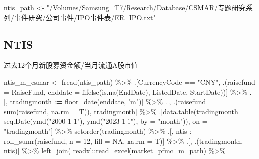 \documentclass[
]{article}
\newenvironment{Shaded}{\begin{snugshade}}{\end{snugshade}}
\newcommand{\AttributeTok}[1]{\textcolor[rgb]{0.77,0.63,0.00}{#1}}
\newcommand{\ConstantTok}[1]{\textcolor[rgb]{0.00,0.00,0.00}{#1}}
\newcommand{\DecValTok}[1]{\textcolor[rgb]{0.00,0.00,0.81}{#1}}
\newcommand{\ErrorTok}[1]{\textcolor[rgb]{0.64,0.00,0.00}{\textbf{#1}}}
\newcommand{\FunctionTok}[1]{\textcolor[rgb]{0.00,0.00,0.00}{#1}}
\newcommand{\NormalTok}[1]{#1}
\newcommand{\OtherTok}[1]{\textcolor[rgb]{0.56,0.35,0.01}{#1}}
\newcommand{\SpecialCharTok}[1]{\textcolor[rgb]{0.00,0.00,0.00}{#1}}
\newcommand{\StringTok}[1]{\textcolor[rgb]{0.31,0.60,0.02}{#1}}
\begin{document}
\begin{Shaded}
\begin{Highlighting}[]
\NormalTok{ntis\_path }\OtherTok{\textless{}{-}} \StringTok{"/Volumes/Samsung\_T7/Research/Database/CSMAR/专题研究系列/事件研究/公司事件/IPO事件表/ER\_IPO.txt"}
\end{Highlighting}
\end{Shaded}

\hypertarget{ntis}{%
\subsection{NTIS}\label{ntis}}

过去12个月新股募资金额/当月流通A股市值

\begin{Shaded}
\begin{Highlighting}[]
\NormalTok{ntis\_m\_csmar }\OtherTok{\textless{}{-}} \FunctionTok{fread}\NormalTok{(ntis\_path) }\SpecialCharTok{\%\textgreater{}\%} 
\NormalTok{  .[CurrencyCode }\SpecialCharTok{==} \StringTok{"CNY"}\NormalTok{, .(}\AttributeTok{raisefund =}\NormalTok{ RaiseFund, }\AttributeTok{enddate =} \FunctionTok{fifelse}\NormalTok{(}\FunctionTok{is.na}\NormalTok{(EndDate), ListedDate, StartDate))] }\SpecialCharTok{\%\textgreater{}\%} 
\NormalTok{  .[, tradingmonth }\SpecialCharTok{:}\ErrorTok{=} \FunctionTok{floor\_date}\NormalTok{(enddate, }\StringTok{"m"}\NormalTok{)] }\SpecialCharTok{\%\textgreater{}\%} 
\NormalTok{  .[, .(}\AttributeTok{raisefund =} \FunctionTok{sum}\NormalTok{(raisefund, }\AttributeTok{na.rm =}\NormalTok{ T)), tradingmonth] }\SpecialCharTok{\%\textgreater{}\%} 
\NormalTok{  .[}\FunctionTok{data.table}\NormalTok{(}\AttributeTok{tradingmonth =} \FunctionTok{seq.Date}\NormalTok{(}\FunctionTok{ymd}\NormalTok{(}\StringTok{"2000{-}1{-}1"}\NormalTok{), }\FunctionTok{ymd}\NormalTok{(}\StringTok{"2023{-}1{-}1"}\NormalTok{), }\AttributeTok{by =} \StringTok{"month"}\NormalTok{)), on }\OtherTok{=} \StringTok{"tradingmonth"}\NormalTok{] }\SpecialCharTok{\%\textgreater{}\%} 
  \FunctionTok{setorder}\NormalTok{(tradingmonth) }\SpecialCharTok{\%\textgreater{}\%} 
\NormalTok{  .[, ntis }\SpecialCharTok{:}\ErrorTok{=}  \FunctionTok{roll\_sumr}\NormalTok{(raisefund, }\AttributeTok{n =} \DecValTok{12}\NormalTok{, }\AttributeTok{fill =} \ConstantTok{NA}\NormalTok{, }\AttributeTok{na.rm =}\NormalTok{ T)] }\SpecialCharTok{\%\textgreater{}\%} 
\NormalTok{  .[, .(tradingmonth, ntis)] }\SpecialCharTok{\%\textgreater{}\%} 
  \FunctionTok{left\_join}\NormalTok{(}
\NormalTok{    readxl}\SpecialCharTok{::}\FunctionTok{read\_excel}\NormalTok{(market\_pfmc\_m\_path) }\SpecialCharTok{\%\textgreater{}\%} 

\end{Highlighting}
\end{Shaded}
\end{document}
